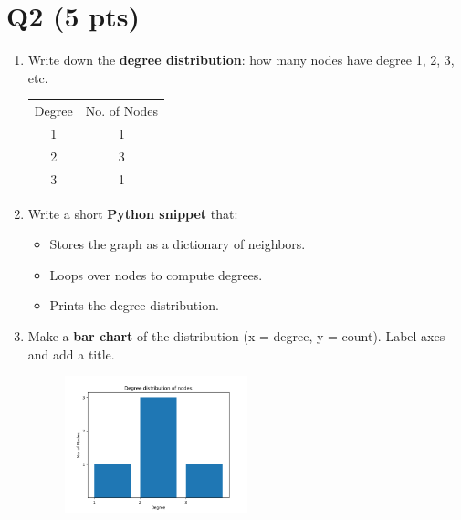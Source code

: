 \documentclass{article}
\begin{document}
\section*{Q2 (5 pts)}

\begin{enumerate}
    \item {
        Write down the \textbf{degree distribution}: how many nodes have degree 1, 2, 3, etc.

        \begin{table}[htbp]
            \centering
            \begin{tabular}{cc}
                Degree & No. of Nodes \\
                1 & 1 \\
                2 & 3 \\
                3 & 1 \\

            \end{tabular}
        \end{table}
    }

    \item {
        Write a short \textbf{Python snippet} that:
        \begin{itemize}
            \item Stores the graph as a dictionary of neighbors.
            \item Loops over nodes to compute degrees.
            \item Prints the degree distribution.
        \end{itemize}

                
    }

    \item {
        Make a \textbf{bar chart} of the distribution (x = degree, y = count). Label axes and add a title.
        \begin{figure}[htbp]
            \centering
            \includegraphics[width=0.5\textwidth]{bar.png}
        \end{figure} 
    }
\end{enumerate}
\end{document}
